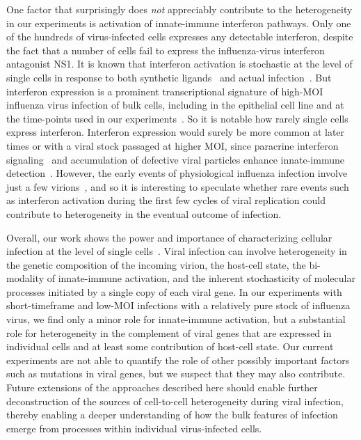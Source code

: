 \documentclass[9pt,lineno]{elife}
\begin{document}
One factor that surprisingly does \emph{not} appreciably contribute to the heterogeneity in our experiments is activation of innate-immune interferon pathways.
Only one of the hundreds of virus-infected cells expresses any detectable interferon, despite the fact that a number of cells fail to express the influenza-virus interferon antagonist NS1.
It is known that interferon activation is stochastic at the level of single cells in response to both synthetic ligands~\citep{shalek2013single,shalek2014single,bhushal2017cell,hagai2017gene} and actual infection~\citep{Rand:2012kl,PerezCidoncha:2014jr,avraham2015pathogen,Killip:2017ef}.
But interferon expression is a prominent transcriptional signature of high-MOI influenza virus infection of bulk cells, including in the epithelial cell line and at the time-points used in our experiments~\citep{Geiss:2002a,sutejo2012activation}.
So it is notable how rarely single cells express interferon.
Interferon expression would surely be more common at later times or with a viral stock passaged at higher MOI, since paracrine interferon signaling~\citep{crotta2013type} and accumulation of defective viral particles enhance innate-immune detection~\citep{Tapia:2013kf,Lopez:2014en}.
However, the early events of physiological influenza infection involve just a few virions~\citep{varble2014influenza,mccrone2017evolutionary}, and so it is interesting to speculate whether rare events such as interferon activation during the first few cycles of viral replication could contribute to heterogeneity in the eventual outcome of infection.

Overall, our work shows the power and importance of characterizing cellular infection at the level of single cells~\citep{avraham2015pathogen}.
Viral infection can involve heterogeneity in the genetic composition of the incoming virion, the host-cell state, the bi-modality of innate-immune activation, and the inherent stochasticity of molecular processes initiated by a single copy of each viral gene.
In our experiments with short-timeframe and low-MOI infections with a relatively pure stock of influenza virus, we find only a minor role for innate-immune activation, but a substantial role for heterogeneity in the complement of viral genes that are expressed in individual cells and at least some contribution of host-cell state.
Our current experiments are not able to quantify the role of other possibly important factors such as mutations in viral genes, but we suspect that they may also contribute.
Future extensions of the approaches described here should enable further deconstruction of the sources of cell-to-cell heterogeneity during viral infection, thereby enabling a deeper understanding of how the bulk features of infection emerge from processes within individual virus-infected cells.
\end{document}
